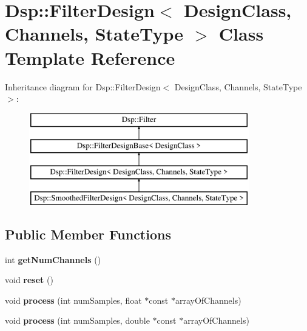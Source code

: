 \hypertarget{classDsp_1_1FilterDesign}{\section{Dsp\-:\-:Filter\-Design$<$ Design\-Class, Channels, State\-Type $>$ Class Template Reference}
\label{classDsp_1_1FilterDesign}
}
Inheritance diagram for Dsp\-:\-:Filter\-Design$<$ Design\-Class, Channels, State\-Type $>$\-:\begin{figure}[H]
\begin{center}
\leavevmode
\includegraphics[height=4.000000cm]{classDsp_1_1FilterDesign}
\end{center}
\end{figure}
\subsection*{Public Member Functions}
\begin{DoxyCompactItemize}
\item 
\hypertarget{classDsp_1_1FilterDesign_a7eae010bd65f97551a629d8065b27c85}{int {\bfseries get\-Num\-Channels} ()}\label{classDsp_1_1FilterDesign_a7eae010bd65f97551a629d8065b27c85}

\item 
\hypertarget{classDsp_1_1FilterDesign_a3ca5bd65490b64ed0e642220a05ef217}{void {\bfseries reset} ()}\label{classDsp_1_1FilterDesign_a3ca5bd65490b64ed0e642220a05ef217}

\item 
\hypertarget{classDsp_1_1FilterDesign_af39665f005929d732ff08ff58335fc3f}{void {\bfseries process} (int num\-Samples, float $\ast$const $\ast$array\-Of\-Channels)}\label{classDsp_1_1FilterDesign_af39665f005929d732ff08ff58335fc3f}

\item 
\hypertarget{classDsp_1_1FilterDesign_ad13f51abb1c3a1c69baf17471e0cc70a}{void {\bfseries process} (int num\-Samples, double $\ast$const $\ast$array\-Of\-Channels)}\label{classDsp_1_1FilterDesign_ad13f51abb1c3a1c69baf17471e0cc70a}

\end{DoxyCompactItemize}
